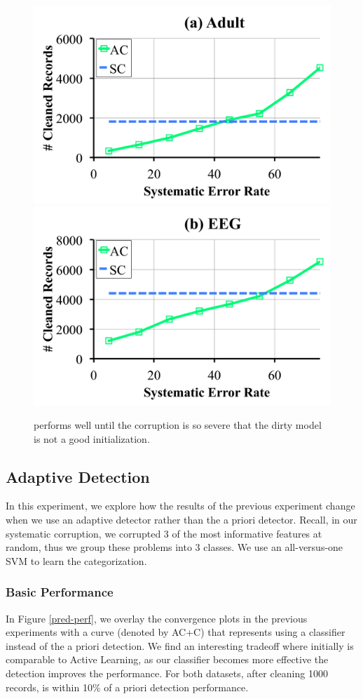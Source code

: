\begin{figure}[ht!]
\centering
 \includegraphics[width=0.49\columnwidth]{exp/exp9a.pdf}
  \includegraphics[width=0.49\columnwidth]{exp/exp9b.pdf}
 \caption{\sys performs well until the corruption is so severe that the dirty model is not a good initialization.  \label{bias}}
\end{figure}

\subsection{Adaptive Detection}
In this experiment, we explore how the results of the previous experiment change when we use an adaptive detector rather than the a priori detector.
Recall, in our systematic corruption, we corrupted 3 of the most informative features at random, thus we group these problems into 3 classes.
We use an all-versus-one SVM to learn the categorization.

\subsubsection{Basic Performance}
In Figure \ref{pred-perf}, we overlay the convergence plots in the previous experiments with a curve (denoted by AC+C) that represents \sys using a classifier instead of the a priori detection.
We find an interesting tradeoff where initially \sys is comparable to Active Learning, as our classifier becomes more effective the detection improves the performance.
For both datasets, after cleaning 1000 records, \sys is within 10\% of a priori detection performance.

\vspace{0.25em}

